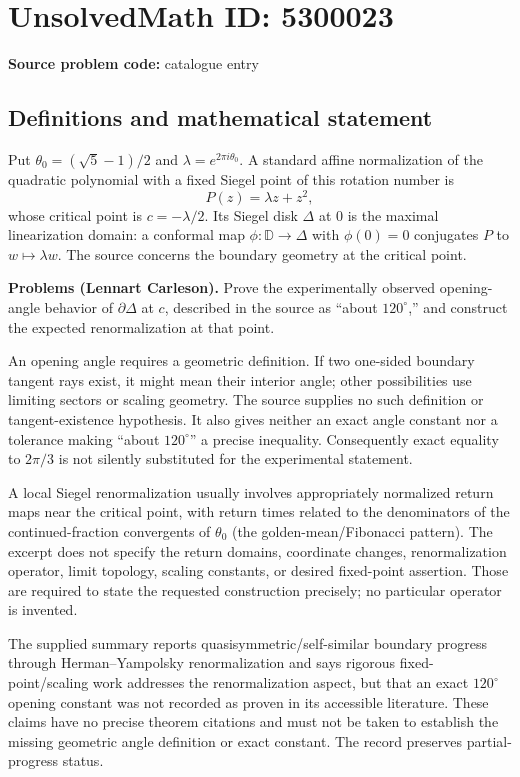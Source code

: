 \documentclass[11pt]{article}
\begin{document}
\section*{UnsolvedMath ID: 5300023}
\textbf{Source problem code:} catalogue entry
\subsection{Definitions and mathematical statement}
Put $\theta_0=(\sqrt5-1)/2$ and $\lambda=e^{2\pi i\theta_0}$. A standard affine normalization of the quadratic polynomial with a fixed Siegel point of this rotation number is
\[
 P(z)=\lambda z+z^2,
\]
whose critical point is $c=-\lambda/2$. Its Siegel disk $\Delta$ at $0$ is the maximal linearization domain: a conformal map $\phi:\mathbb D\to\Delta$ with $\phi(0)=0$ conjugates $P$ to $w\mapsto\lambda w$. The source concerns the boundary geometry at the critical point.

\textbf{Problems (Lennart Carleson).} Prove the experimentally observed opening-angle behavior of $\partial\Delta$ at $c$, described in the source as ``about $120^\circ$,'' and construct the expected renormalization at that point.

An opening angle requires a geometric definition. If two one-sided boundary tangent rays exist, it might mean their interior angle; other possibilities use limiting sectors or scaling geometry. The source supplies no such definition or tangent-existence hypothesis. It also gives neither an exact angle constant nor a tolerance making ``about $120^\circ$'' a precise inequality. Consequently exact equality to $2\pi/3$ is not silently substituted for the experimental statement.

A local Siegel renormalization usually involves appropriately normalized return maps near the critical point, with return times related to the denominators of the continued-fraction convergents of $\theta_0$ (the golden-mean/Fibonacci pattern). The excerpt does not specify the return domains, coordinate changes, renormalization operator, limit topology, scaling constants, or desired fixed-point assertion. Those are required to state the requested construction precisely; no particular operator is invented.

The supplied summary reports quasisymmetric/self-similar boundary progress through Herman--Yampolsky renormalization and says rigorous fixed-point/scaling work addresses the renormalization aspect, but that an exact $120^\circ$ opening constant was not recorded as proven in its accessible literature. These claims have no precise theorem citations and must not be taken to establish the missing geometric angle definition or exact constant. The record preserves partial-progress status.
\end{document}
